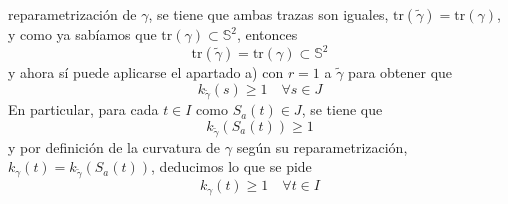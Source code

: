 \documentclass[12pt]{article}
\newcommand{\Ss}{\mathbb{S}}
\newcommand{\tr}{\text{tr}}
\begin{document}
\begin{ejercicio}
\begin{enumerate}
            reparametrización de $\gamma$, se tiene que ambas trazas son iguales, $\tr(\tilde{\gamma}) = \tr(\gamma)$,
            y como ya sabíamos que $\tr(\gamma) \subset \Ss^2$, entonces
            $$\tr(\tilde{\gamma}) = \tr(\gamma) \subset \Ss^2$$
            y ahora sí puede aplicarse el apartado a) con $r=1$ a $\tilde{\gamma}$ para obtener que 
            $$k_{\tilde{\gamma}}(s) \geq 1 \quad \forall s \in J$$
            En particular, para cada $t \in I$ como $S_a(t) \in J$, se tiene que
            $$k_{\tilde{\gamma}}(S_a(t)) \geq 1$$
            y por definición de la curvatura de $\gamma$ según su reparametrización, 
            $k_\gamma(t) = k_{\tilde{\gamma}}(S_a(t))$, deducimos lo que se pide
            $$\boxed{k_\gamma(t) \geq 1 \quad \forall t \in I}$$
        \end{enumerate}
    \end{ejercicio}

    \newpage
\end{document}
